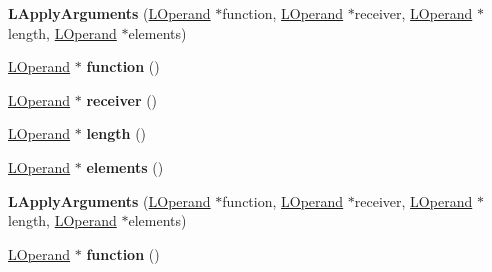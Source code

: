 \begin{DoxyCompactItemize}
\item 
{\bfseries L\+Apply\+Arguments} (\hyperlink{classv8_1_1internal_1_1_l_operand}{L\+Operand} $\ast$function, \hyperlink{classv8_1_1internal_1_1_l_operand}{L\+Operand} $\ast$receiver, \hyperlink{classv8_1_1internal_1_1_l_operand}{L\+Operand} $\ast$length, \hyperlink{classv8_1_1internal_1_1_l_operand}{L\+Operand} $\ast$elements)\hypertarget{classv8_1_1internal_1_1_l_apply_arguments_a03722f1b30078ec905687e48dd73c80d}{}\label{classv8_1_1internal_1_1_l_apply_arguments_a03722f1b30078ec905687e48dd73c80d}

\item 
\hyperlink{classv8_1_1internal_1_1_l_operand}{L\+Operand} $\ast$ {\bfseries function} ()\hypertarget{classv8_1_1internal_1_1_l_apply_arguments_af7fa90a86d06b14c9991f9c68115415b}{}\label{classv8_1_1internal_1_1_l_apply_arguments_af7fa90a86d06b14c9991f9c68115415b}

\item 
\hyperlink{classv8_1_1internal_1_1_l_operand}{L\+Operand} $\ast$ {\bfseries receiver} ()\hypertarget{classv8_1_1internal_1_1_l_apply_arguments_a6cd58169b6ce998cb4a7fadaebdf8ae5}{}\label{classv8_1_1internal_1_1_l_apply_arguments_a6cd58169b6ce998cb4a7fadaebdf8ae5}

\item 
\hyperlink{classv8_1_1internal_1_1_l_operand}{L\+Operand} $\ast$ {\bfseries length} ()\hypertarget{classv8_1_1internal_1_1_l_apply_arguments_a7184d82b892039d6cd4cae3b4d9f3f9d}{}\label{classv8_1_1internal_1_1_l_apply_arguments_a7184d82b892039d6cd4cae3b4d9f3f9d}

\item 
\hyperlink{classv8_1_1internal_1_1_l_operand}{L\+Operand} $\ast$ {\bfseries elements} ()\hypertarget{classv8_1_1internal_1_1_l_apply_arguments_acb08ae582ad76ef25684e2361409c0e4}{}\label{classv8_1_1internal_1_1_l_apply_arguments_acb08ae582ad76ef25684e2361409c0e4}

\item 
{\bfseries L\+Apply\+Arguments} (\hyperlink{classv8_1_1internal_1_1_l_operand}{L\+Operand} $\ast$function, \hyperlink{classv8_1_1internal_1_1_l_operand}{L\+Operand} $\ast$receiver, \hyperlink{classv8_1_1internal_1_1_l_operand}{L\+Operand} $\ast$length, \hyperlink{classv8_1_1internal_1_1_l_operand}{L\+Operand} $\ast$elements)\hypertarget{classv8_1_1internal_1_1_l_apply_arguments_a03722f1b30078ec905687e48dd73c80d}{}\label{classv8_1_1internal_1_1_l_apply_arguments_a03722f1b30078ec905687e48dd73c80d}

\item 
\hyperlink{classv8_1_1internal_1_1_l_operand}{L\+Operand} $\ast$ {\bfseries function} ()\hypertarget{classv8_1_1internal_1_1_l_apply_arguments_af7fa90a86d06b14c9991f9c68115415b}{}\label{classv8_1_1internal_1_1_l_apply_arguments_af7fa90a86d06b14c9991f9c68115415b}


\end{DoxyCompactItemize}
